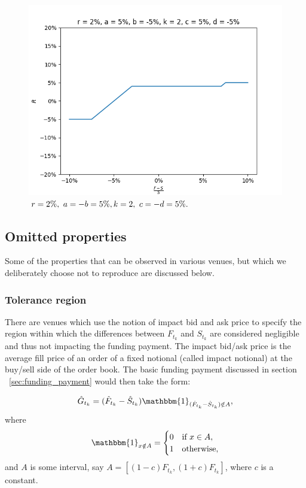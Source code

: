 \documentclass[10pt]{article}
\begin{document}
\begin{figure}[!htb]
  \includegraphics[width=\linewidth]{./plots/r_0.02_a_0.05_b_-0.05_c_0.05_d_-0.05_k_2.png}
  \caption{$\\r=2\%,\ a=-b=5\%,\\ k=2,\ c=-d=5\%.$}\label{fig:clamp3}
\endminipage
\end{figure}

\subsection{Omitted properties}
Some of the properties that can be observed in various venues, but which we deliberately choose not to reproduce are discussed below.

\subsubsection{Tolerance region}

There are venues which use the notion of impact bid and ask price to specify the region within which the differences between $F_{t_k}$ and $S_{t_k}$ are considered negligible and thus not impacting the funding payment. The impact bid/ask price is the average fill price of an order of a fixed notional (called impact notional) at the buy/sell side of the order book. The basic funding payment discussed in section ~\ref{sec:funding_payment} would then take the form:

$$
 \hat G_{t_k} = (\hat F_{t_k} - \hat S_{t_k})\mathbbm{1}_{ (\hat F_{t_k} - \hat S_{t_k}) \notin A },
$$
where
$$
\mathbbm{1}_{ x \notin A } = \begin{cases}
    0 & \text{if } x \in A,\\
    1              & \text{otherwise,}
\end{cases}
$$ 
and $A$ is some interval, say $A=[(1-c)F_{t_k},(1+c)F_{t_k}]$, where $c$ is a constant.
\end{document}
